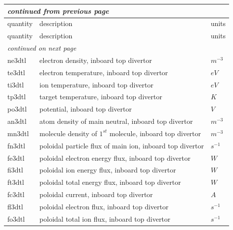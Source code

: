 \documentclass[a4paper,10pt]{report}
\begin{document}
\begin{center}
    \begin{longtable}{|l|l|l|}
    \hline
    \multicolumn{3}{|l|}{\small\sl continued from previous page} \\
    \hline quantity & description & units \\
    \hline \endhead
    \hline quantity & description & units \\
    \hline \endfirsthead
    \hline
    \multicolumn{3}{|l|}{\small\sl continued on next page} \\
    \hline \endfoot
    \endlastfoot
ne3dtl \index{ne3dtl}\index{b2time.nc, ne3dtl} & electron density, inboard top divertor & $m^{-3}$ \\
te3dtl \index{te3dtl}\index{b2time.nc, te3dtl} & electron temperature, inboard top divertor & $eV$ \\
ti3dtl \index{ti3dtl}\index{b2time.nc, ti3dtl} & ion temperature, inboard top divertor & $eV$ \\
tp3dtl \index{tp3dtl}\index{b2time.nc, tp3dtl} & target temperature, inboard top divertor & $K $ \\
po3dtl \index{po3dtl}\index{b2time.nc, po3dtl} & potential, inboard top divertor & $V $ \\
an3dtl \index{an3dtl}\index{b2time.nc, an3dtl} & atom density of main neutral, inboard top divertor & $m^{-3}$ \\
mn3dtl \index{mn3dtl}\index{b2time.nc, mn3dtl} & molecule density of $1^{st}$ molecule, inboard top divertor & $m^{-3}$ \\
fn3dtl \index{fn3dtl}\index{b2time.nc, fn3dtl} & poloidal particle flux of main ion, inboard top divertor & $s^{-1}$ \\
fe3dtl \index{fe3dtl}\index{b2time.nc, fe3dtl} & poloidal electron energy flux, inboard top divertor & $W $ \\
fi3dtl \index{fi3dtl}\index{b2time.nc, fi3dtl} & poloidal ion energy flux, inboard top divertor & $W $ \\
ft3dtl \index{ft3dtl}\index{b2time.nc, ft3dtl} & poloidal total energy flux, inboard top divertor & $W $ \\
fc3dtl \index{fc3dtl}\index{b2time.nc, fc3dtl} & poloidal current, inboard top divertor  & $A $ \\
fl3dtl \index{fl3dtl}\index{b2time.nc, fl3dtl} & poloidal electron flux, inboard top divertor & $s^{-1}$ \\
fo3dtl \index{fo3dtl}\index{b2time.nc, fo3dtl} & poloidal total ion flux, inboard top divertor & $s^{-1}$ \\

\end{longtable}
\end{center}
\end{document}
